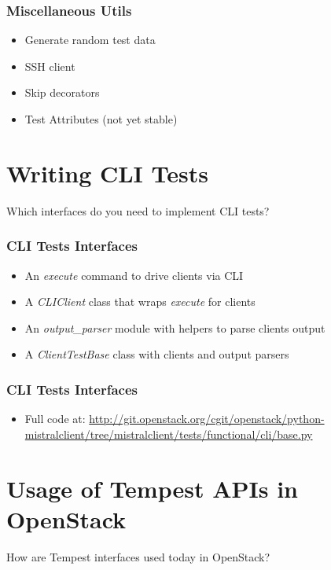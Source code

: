 \documentclass[aspectratio=169,11pt,hyperref={colorlinks=true}]{beamer}
\begin{document}
\begin{frame}
    \frametitle{Miscellaneous Utils}
    \begin{itemize}
        \item Generate random test data
        \item SSH client
        \item Skip decorators
        \item Test Attributes (not yet stable)
    \end{itemize}
\end{frame}

\section{Writing CLI Tests}
\begin{frame}[c]
    \begin{center}
        \large Which interfaces do you need to implement CLI tests?
    \end{center}
\end{frame}

\begin{frame}
    \frametitle{CLI Tests Interfaces}
    \begin{itemize}
        \item An \emph{execute} command to drive clients via CLI
        \item A \emph{CLIClient} class that wraps \emph{execute} for clients
        \item An \emph{output\_parser} module with helpers to parse clients output
        \item A \emph{ClientTestBase} class with clients and output parsers
    \end{itemize}
\end{frame}

\begin{frame}
    \frametitle{CLI Tests Interfaces}
    
    \begin{itemize}
        \item \tiny Full code at: \href{http://git.openstack.org/cgit/openstack/python-mistralclient/tree/mistralclient/tests/functional/cli/base.py}{http://git.openstack.org/cgit/openstack/python-mistralclient/tree/mistralclient/tests/functional/cli/base.py}
    \end{itemize}
\end{frame}

\section{Usage of Tempest APIs in OpenStack}
\begin{frame}[c]
    \begin{center}
        \large How are Tempest interfaces used today in OpenStack?
    \end{center}
\end{frame}
\end{document}
